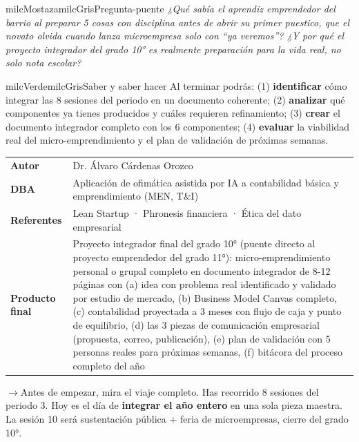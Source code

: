 \documentclass[11pt,letterpaper]{article}
\newcommand{\puente}[1]{%
  \begin{puentebox}%
    \textcolor{milcGradeDark}{$\rightarrow$}\hspace{2mm}#1%
  \end{puentebox}%
}
\begin{document}
\begin{softbox}{milcMostaza}{milcGris}{Pregunta-puente}
\textit{¿Qué sabía el aprendiz emprendedor del barrio al preparar 5 cosas con disciplina antes de abrir su primer puestico, que el novato olvida cuando lanza microempresa solo con \emph{``ya veremos''}? ¿Y por qué el proyecto integrador del grado 10° es realmente preparación para la vida real, no solo nota escolar?}
\end{softbox}

\begin{softbox}{milcVerde}{milcGris}{Saber y saber hacer}
Al terminar podrás: (1) \textbf{identificar} cómo integrar las 8 sesiones del periodo en un documento coherente; (2) \textbf{analizar} qué componentes ya tienes producidos y cuáles requieren refinamiento; (3) \textbf{crear} el documento integrador completo con los 6 componentes; (4) \textbf{evaluar} la viabilidad real del micro-emprendimiento y el plan de validación de próximas semanas.
\end{softbox}



\small
\begin{tabularx}{\textwidth}{>{\bfseries}p{3.0cm}Y}
Autor & Dr. Álvaro Cárdenas Orozco\\
DBA & Aplicación de ofimática asistida por IA a contabilidad básica y emprendimiento (MEN, T\&I)\\
Referentes & Lean Startup · Phronesis financiera · Ética del dato empresarial\\
Producto final & Proyecto integrador final del grado 10° (puente directo al proyecto emprendedor del grado 11°): micro-emprendimiento personal o grupal completo en documento integrador de 8-12 páginas con (a) idea con problema real identificado y validado por estudio de mercado, (b) Business Model Canvas completo, (c) contabilidad proyectada a 3 meses con flujo de caja y punto de equilibrio, (d) las 3 piezas de comunicación empresarial (propuesta, correo, publicación), (e) plan de validación con 5 personas reales para próximas semanas, (f) bitácora del proceso completo del año\\
\end{tabularx}
\normalsize

\puente{Antes de empezar, mira el viaje completo. Has recorrido 8 sesiones del periodo 3. Hoy es el día de \textbf{integrar el año entero} en una sola pieza maestra. La sesión 10 será sustentación pública + feria de microempresas, cierre del grado 10°.}
\end{document}
